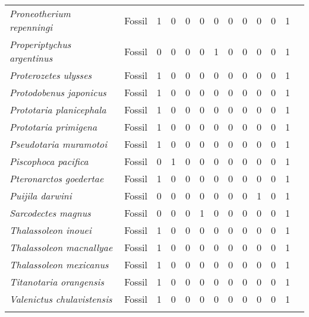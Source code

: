 \begin{longtable}{llccccccccccp{}}
\textit{Proneotherium repenningi} &
Fossil &
1 &
0 &
0 &
0 &
0 &
0 &
0 &
0 &
0 &
1 &
\\

\textit{Properiptychus argentinus} &
Fossil &
0 &
0 &
0 &
0 &
1 &
0 &
0 &
0 &
0 &
1 &
\\

\textit{Proterozetes ulysses} &
Fossil &
1 &
0 &
0 &
0 &
0 &
0 &
0 &
0 &
0 &
1 &
\\

\textit{Protodobenus japonicus} &
Fossil &
1 &
0 &
0 &
0 &
0 &
0 &
0 &
0 &
0 &
1 &
\\

\textit{Prototaria planicephala} &
Fossil &
1 &
0 &
0 &
0 &
0 &
0 &
0 &
0 &
0 &
1 &
\\

\textit{Prototaria primigena} &
Fossil &
1 &
0 &
0 &
0 &
0 &
0 &
0 &
0 &
0 &
1 &
\\

\textit{Pseudotaria muramotoi} &
Fossil &
1 &
0 &
0 &
0 &
0 &
0 &
0 &
0 &
0 &
1 &
\\

\textit{Piscophoca pacifica} &
Fossil &
0 &
1 &
0 &
0 &
0 &
0 &
0 &
0 &
0 &
1 &
\\

\textit{Pteronarctos goedertae} &
Fossil &
1 &
0 &
0 &
0 &
0 &
0 &
0 &
0 &
0 &
1 &
\\

\textit{Puijila darwini} &
Fossil &
0 &
0 &
0 &
0 &
0 &
0 &
0 &
1 &
0 &
1 &
\\

\textit{Sarcodectes magnus} &
Fossil &
0 &
0 &
0 &
1 &
0 &
0 &
0 &
0 &
0 &
1 &
\\

\textit{Thalassoleon inouei} &
Fossil &
1 &
0 &
0 &
0 &
0 &
0 &
0 &
0 &
0 &
1 &
\\

\textit{Thalassoleon macnallyae} &
Fossil &
1 &
0 &
0 &
0 &
0 &
0 &
0 &
0 &
0 &
1 &
\\

\textit{Thalassoleon mexicanus} &
Fossil &
1 &
0 &
0 &
0 &
0 &
0 &
0 &
0 &
0 &
1 &
\\

\textit{Titanotaria orangensis} &
Fossil &
1 &
0 &
0 &
0 &
0 &
0 &
0 &
0 &
0 &
1 &
\\

\textit{Valenictus chulavistensis} &
Fossil &
1 &
0 &
0 &
0 &
0 &
0 &
0 &
0 &
0 &
1 &
\\
\hline

\label{table-biogeo-data}
\end{longtable}